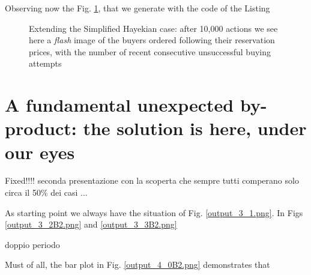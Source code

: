 \documentclass[10pt]{report}
\begin{document}
\begin{appendices}
Observing now the Fig. \ref{output_4_0B1.png}, that we generate with the code of the Listing

\begin{figure}[H]
\begin{center}
\caption{Extending the Simplified Hayekian case: after 10,000 actions we see here a \emph{flash} image of the buyers ordered  following their reservation prices, with the number of recent consecutive unsuccessful buying attempts}
\label{output_4_0B1.png}
\end{center}
\end{figure}






\section{A fundamental unexpected by-product: the solution is here, under our eyes}

Fixed!!!!
seconda presentazione con la scoperta che sempre tutti comperano solo circa il 50\% dei casi ...

As starting point we always have the situation of Fig. \ref{output_3_1.png}. In Figs \ref{output_3_2B2.png} and \ref{output_3_3B2.png}

doppio periodo

Must of all, the bar plot in Fig. \ref{output_4_0B2.png} demonstrates that


\end{appendices}
\end{document}
